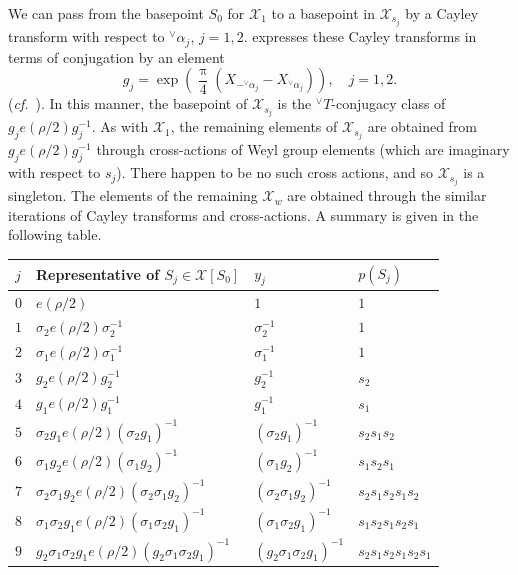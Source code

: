 \documentclass[a4paper, 11pt]{article}
\begin{document}
We can pass from the basepoint $S_{0}$ for $\mathcal{X}_{1}$ to a
basepoint in $\mathcal{X}_{s_{j}}$  by a Cayley transform with
respect to ${^\vee}\alpha_{j}$, $j=1,2$.  \cite[Equation (14.5)]{Adams-Fokko}
expresses these Cayley transforms in terms of conjugation by an element
$$g_{j}  = \exp\left( \frac{\uppi}{4} ( X_{-{^\vee}\alpha_{j}} -
X_{{^\vee}\alpha_{j}}) \right), \quad j = 1,2.$$
(\emph{cf.}~\cite[(6.65a)]{Beyond}).  In this manner, the basepoint of
$\mathcal{X}_{s_{j}}$ is the ${^\vee}T$-conjugacy class
of $g_{j} e(\rho/2) g_{j}^{-1}$.  As with
$\mathcal{X}_{1}$, the remaining elements of
$\mathcal{X}_{s_{j}}$ are obtained from $g_{j}
e(\rho/2) g_{j}^{-1}$ through cross-actions of Weyl group elements
(which are imaginary with respect to $s_{j}$).  There happen to be no
such cross actions, and so 
$\mathcal{X}_{s_{j}}$ is a singleton.  The elements of
the remaining $\mathcal{X}_{w}$ are obtained through the similar
iterations of Cayley transforms and cross-actions.  A summary is given
in the following table.
\begin{center}
\begin{tabular}{|l|l|l|l|}
\hline
$j$ & Representative of  $S_{j} \in \mathcal{X}[S_{0}]$ &
$y_{j}$ & $p(S_{j})$ \\ 
\hline
\hline
$0$ & $e(\rho/2)$ & $1$ & $1$\\
\hline
$1$ &   $\sigma_{2} e(\rho/2) \sigma_{2}^{-1}$ &
$\sigma_{2}^{-1}$ & $1$\\
\hline
$2$ & $\sigma_{1} e(\rho/2) \sigma_{1}^{-1}$ &
$\sigma_{1}^{-1}$ & $1$\\ 
\hline 
$3$ &   $g_{2} e(\rho/2) g_{2}^{-1}$ &
$g_{2}^{-1}$ & $s_{2}$ \\
\hline
$4$ &  $g_{1} e(\rho/2) g_{1}^{-1}$ &
$g_{1}^{-1}$ & $s_{1}$\\
\hline
$5$ &  $\sigma_{2}g_{1} e(\rho/2)
(\sigma_{2}g_{1})^{-1}$ & 
$(\sigma_{2}g_{1})^{-1}$ & $s_{2} s_{1} s_{2}$ \\
\hline
$6$ &  $\sigma_{1}g_{2} e(\rho/2)
(\sigma_{1}g_{2})^{-1}$ & 
$(\sigma_{1}g_{2})^{-1}$ & $s_{1}s_{2} s_{1}$ \\
\hline
$7$ &  $\sigma_{2}\sigma_{1}g_{2} e(\rho/2)
(\sigma_{2}\sigma_{1}g_{2})^{-1}$ & 
$(\sigma_{2}\sigma_{1}g_{2})^{-1}$ & $s_{2}s_{1}s_{2} s_{1}s_{2}  $\\
\hline
$8$ &  $\sigma_{1}\sigma_{2}g_{1} e(\rho/2)
(\sigma_{1}\sigma_{2}g_{1})^{-1}$ & 
$(\sigma_{1}\sigma_{2}g_{1})^{-1}$  & $s_{1}s_{2} s_{1} s_{2}s_{1}$\\
\hline
$9$ &  $g_{2}\sigma_{1}\sigma_{2}g_{1} e(\rho/2)
(g_{2}\sigma_{1}\sigma_{2}g_{1})^{-1}$ & 
$(g_{2}\sigma_{1}\sigma_{2}g_{1})^{-1}$ & $s_{2}s_{1}s_{2} s_{1}
s_{2}s_{1}$ \\  
\hline
\end{tabular}
\label{orbitdata}
\end{center}
\end{document}
